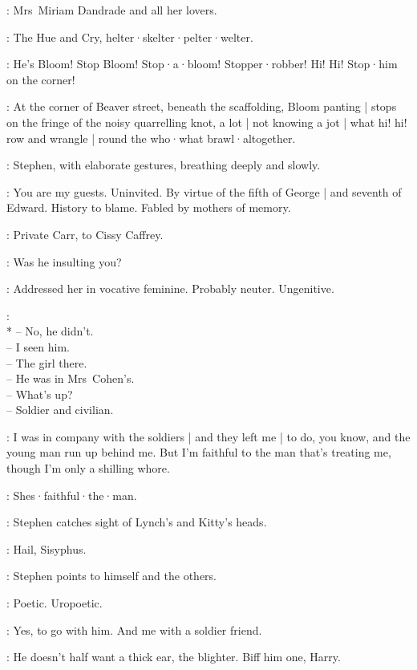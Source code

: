 :
Mrs~Miriam Dandrade and all her lovers.

:
The Hue and Cry,
helter·skelter·pelter·welter.

\HueCry:
He's Bloom!
Stop Bloom!
Stop·a·bloom!
Stopper·robber!
Hi!
Hi!
Stop·him on the corner!


:
At the corner of Beaver street,
beneath the scaffolding,
Bloom panting |
stops on the fringe of the noisy quarrelling knot,
a lot |
not knowing a jot |
what hi!
hi!
row and wrangle |
round the who·what brawl·altogether.

:
Stephen,
with elaborate gestures,
breathing deeply and slowly.

\Stephen:
You are my guests.
Uninvited.
By virtue of the fifth of George |
and seventh of Edward.
History to blame.
Fabled by mothers of memory.

:
Private Carr,
to Cissy Caffrey.

\Carr:
Was he insulting you?

\Stephen:
Addressed her in vocative feminine.
Probably neuter.
Ungenitive.

\Voices:\\*
-- No, he didn't.\\
-- I seen him.\\
-- The girl there.\\
-- He was in Mrs~Cohen's.\\
-- What's up?\\
-- Soldier and civilian.

\Cissy[2]:
%
I was in company with the soldiers |
and they left me |
to do,
you know,
and the young man run up behind me.
But I'm faithful to the man that's treating me,
though I'm only a shilling whore.

\Voices:
Shes·faithful·the·man.

:
Stephen catches sight of Lynch's and Kitty's heads.

\Stephen:
Hail,
Sisyphus.

:
Stephen points to himself and the others.

\Stephen:
Poetic.
Uropoetic.

\Cissy:
Yes,
to go with him.
%
And me with a soldier friend.

\Compton[2]:
He doesn't half want a thick ear,
the blighter.
Biff him one,
Harry.

